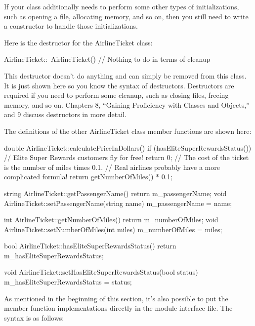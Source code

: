 If your class additionally needs to perform some other types of initializations, such as opening a file, allocating memory, and so on, then you still need to write a constructor to handle those initializations.

Here is the destructor for the AirlineTicket class:

\begin{cpp}
AirlineTicket::~AirlineTicket()
{
    // Nothing to do in terms of cleanup
}
\end{cpp}

This destructor doesn’t do anything and can simply be removed from this class. It is just shown here so you know the syntax of destructors. Destructors are required if you need to perform some cleanup, such as closing files, freeing memory, and so on. Chapters 8, “Gaining Proficiency with Classes and Objects,” and 9 discuss destructors in more detail.

The definitions of the other AirlineTicket class member functions are shown here:

\begin{cpp}
double AirlineTicket::calculatePriceInDollars()
{
    if (hasEliteSuperRewardsStatus()) {
        // Elite Super Rewards customers fly for free!
        return 0;
    }
    // The cost of the ticket is the number of miles times 0.1.
    // Real airlines probably have a more complicated formula!
    return getNumberOfMiles() * 0.1;
}

string AirlineTicket::getPassengerName() { return m_passengerName; }
void AirlineTicket::setPassengerName(string name) { m_passengerName = name; }

int AirlineTicket::getNumberOfMiles() { return m_numberOfMiles; }
void AirlineTicket::setNumberOfMiles(int miles) { m_numberOfMiles = miles; }

bool AirlineTicket::hasEliteSuperRewardsStatus()
{
    return m_hasEliteSuperRewardsStatus;
}

void AirlineTicket::setHasEliteSuperRewardsStatus(bool status)
{
    m_hasEliteSuperRewardsStatus = status;
}
\end{cpp}

As mentioned in the beginning of this section, it’s also possible to put the member function implementations directly in the module interface file. The syntax is as follows:

